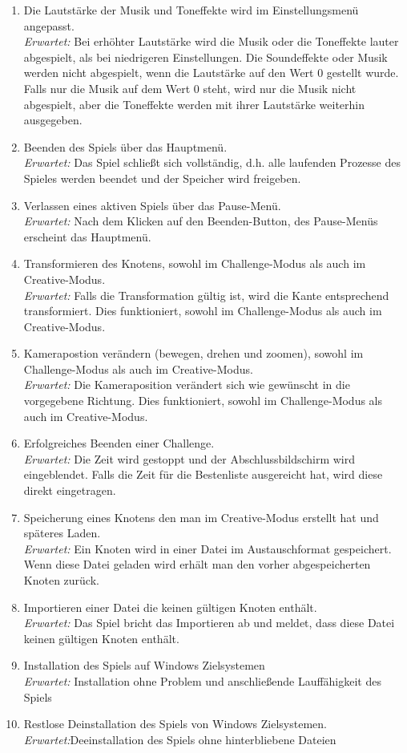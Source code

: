 \begin{enumerate}
\item Die Lautstärke der Musik und Toneffekte wird im Einstellungsmenü angepasst. \\  
\textit{Erwartet:} Bei erhöhter Lautstärke wird die Musik oder die Toneffekte lauter abgespielt, als bei niedrigeren Einstellungen. Die Soundeffekte oder Musik werden nicht abgespielt, wenn die Lautstärke auf den Wert 0 gestellt wurde. Falls nur die Musik auf dem Wert 0 steht, wird nur die Musik nicht abgespielt, aber die Toneffekte werden mit ihrer Lautstärke weiterhin ausgegeben.
\item Beenden des Spiels über das Hauptmenü.\\
\textit{Erwartet:} Das Spiel schließt sich vollständig, d.h. alle laufenden Prozesse des Spieles werden beendet und der Speicher wird freigeben.
\item Verlassen eines aktiven Spiels über das Pause-Menü.\\
\textit{Erwartet:} Nach dem Klicken auf den Beenden-Button, des Pause-Menüs erscheint das Hauptmenü.
\item Transformieren des Knotens, sowohl im Challenge-Modus als auch im Creative-Modus.\\
\textit{Erwartet:} Falls die Transformation gültig ist, wird die Kante entsprechend transformiert. Dies funktioniert, sowohl im Challenge-Modus als auch im Creative-Modus.
\item Kamerapostion verändern (bewegen, drehen und zoomen), sowohl im Challenge-Modus als auch im Creative-Modus.\\
\textit{Erwartet:} Die Kameraposition verändert sich wie gewünscht in die vorgegebene Richtung. Dies funktioniert, sowohl im Challenge-Modus als auch im Creative-Modus.
\item Erfolgreiches Beenden einer Challenge. \\
\textit{Erwartet:} Die Zeit wird gestoppt und der Abschlussbildschirm wird eingeblendet. Falls die Zeit für die Bestenliste ausgereicht hat, wird diese direkt eingetragen.
\item Speicherung eines Knotens den man im Creative-Modus erstellt hat und späteres Laden.\\
\textit{Erwartet:} Ein Knoten wird in einer Datei im Austauschformat gespeichert. Wenn diese Datei geladen wird erhält man den vorher abgespeicherten Knoten zurück.
\item Importieren einer Datei die keinen gültigen Knoten enthält.\\
\textit{Erwartet:} Das Spiel bricht das Importieren ab und meldet, dass diese Datei keinen gültigen Knoten enthält.
\item Installation des Spiels auf Windows Zielsystemen\\
\textit{Erwartet:} Installation ohne Problem und anschließende Lauffähigkeit des Spiels
\item Restlose Deinstallation des Spiels von Windows Zielsystemen.\\
\textit{Erwartet:}Deeinstallation des Spiels ohne hinterbliebene Dateien

\end{enumerate}


